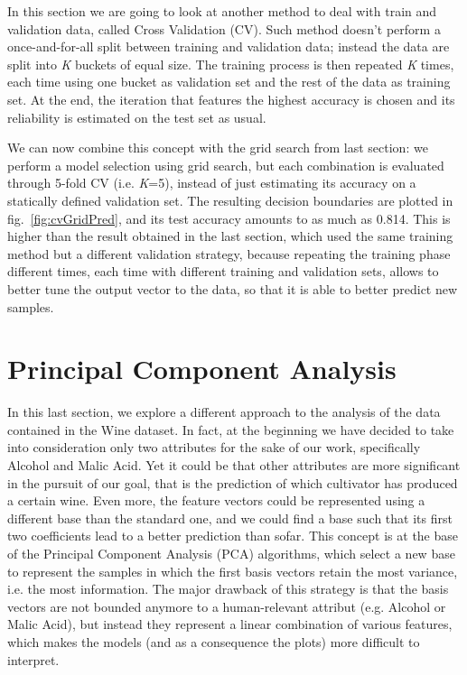 \documentclass[11pt,twoside,a4paper]{article}
\begin{document}
In this section we are going to look at another method to deal with train and validation data, called Cross Validation (CV). Such method doesn't perform a once-and-for-all split between training and validation data; instead the data are split into \emph{K} buckets of equal size. The training process is then repeated \emph{K} times, each time using one bucket as validation set and the rest of the data as training set. At the end, the iteration that features the highest accuracy is chosen and its reliability is estimated on the test set as usual.

We can now combine this concept with the grid search from last section: we perform a model selection using grid search, but each combination is evaluated through 5-fold CV (i.e. \emph{K}=5), instead of just estimating its accuracy on a statically defined validation set. The resulting decision boundaries are plotted in fig.~\ref{fig:cvGridPred}, and its test accuracy amounts to as much as 0.814. This is higher than the result obtained in the last section, which used the same training method but a different validation strategy, because repeating the training phase different times, each time with different training and validation sets, allows to better tune the output vector to the data, so that it is able to better predict new samples.


\section{Principal Component Analysis}
In this last section, we explore a different approach to the analysis of the data contained in the Wine dataset. In fact, at the beginning we have decided to take into consideration only two attributes for the sake of our work, specifically Alcohol and Malic Acid. Yet it could be that other attributes are more significant in the pursuit of our goal, that is the prediction of which cultivator has produced a certain wine. Even more, the feature vectors could be represented using a different base than the standard one, and we could find a base such that its first two coefficients lead to a better prediction than sofar.\newline
This concept is at the base of the Principal Component Analysis (PCA) algorithms, which select a new base to represent the samples in which the first basis vectors retain the most variance, i.e. the most information. The major drawback of this strategy is that the basis vectors are not bounded anymore to a human-relevant attribut (e.g. Alcohol or Malic Acid), but instead they represent a linear combination of various features, which makes the models (and as a consequence the plots) more difficult to interpret.
\end{document}
